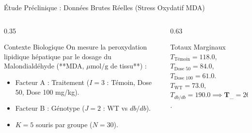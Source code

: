 \documentclass[aspectratio=169,10pt]{beamer}
\begin{document}
\begin{frame}{Étude Préclinique : Données Brutes Réelles (Stress Oxydatif MDA)}
  \begin{columns}[onlytextwidth, T]
    \begin{column}{0.35\linewidth}
      \begin{biobox}{Contexte Biologique}
        On mesure la peroxydation lipidique hépatique par le dosage du Malondialdéhyde (**MDA, $\mu\text{mol/g}$ de tissu**) :
        \begin{itemize}
          \item Facteur A : Traitement ($I = 3$ : Témoin, Dose 50, Dose 100 mg/kg).
          \item Facteur B : Génotype ($J = 2$ : WT vs $db/db$).
          \item $K = 5$ souris par groupe ($N = 30$).
        \end{itemize}
      \end{biobox}
    \end{column}
    \begin{column}{0.63\linewidth}
      \begin{table}[h]
        \centering
        \scriptsize
      \end{table}
      \vspace{-2mm}
      \begin{takeawaybox}{Totaux Marginaux}
        $T_{\text{Témoin}} = 118.0$, $T_{\text{Dose 50}} = 84.0$, $T_{\text{Dose 100}} = 61.0$.\\
        $T_{\text{WT}} = 73.0$, $T_{db/db} = 190.0 \implies \mathbf{T_{\dots} = 263.0\,\mu\text{mol/g}}$.
      \end{takeawaybox}
    \end{column}
  \end{columns}
\end{frame}
\end{document}
